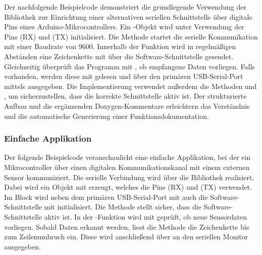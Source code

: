 Der nachfolgende Beispielcode demonstriert die grundlegende Verwendung der  Bibliothek   zur Einrichtung einer alternativen seriellen Schnittstelle über digitale Pins eines Arduino-Mikrocontrollers. Ein -Objekt wird unter Verwendung der Pins  (RX) und  (TX) initialisiert. Die Methode  startet die serielle Kommunikation mit einer Baudrate von 9600.
Innerhalb der Funktion  wird in regelmäßigen Abständen eine Zeichenkette mit  über die Software-Schnittstelle gesendet. Gleichzeitig überprüft das Programm mit , ob empfangene Daten vorliegen. Falls vorhanden, werden diese mit  gelesen und über den primären USB-Serial-Port mittels  ausgegeben.
Die Implementierung verwendet außerdem die Methoden  und , um sicherzustellen, dass die korrekte Schnittstelle aktiv ist. Der strukturierte Aufbau und die ergänzenden Doxygen-Kommentare erleichtern das Verständnis und die automatische Generierung einer Funktionsdokumentation.

{
}

\subsubsection{Einfache Applikation}
Der folgende Beispielcode veranschaulicht eine einfache Applikation, bei der ein Mikrocontroller über einen digitalen Kommunikationskanal mit einem externen Sensor kommuniziert. Die serielle Verbindung wird über die Bibliothek  realisiert. Dabei wird ein Objekt  mit  erzeugt, welches die Pins  (RX) und  (TX) verwendet.
Im Block  wird neben dem primären USB-Serial-Port mit  auch die Software-Schnittstelle mit   initialisiert. Die Methode  stellt sicher, dass die Software-Schnittstelle aktiv ist.
In der -Funktion wird mit  geprüft, ob neue Sensordaten vorliegen. Sobald Daten erkannt werden, liest die Methode  die Zeichenkette bis zum Zeilenumbruch ein. Diese wird anschließend über  an den seriellen Monitor ausgegeben.

